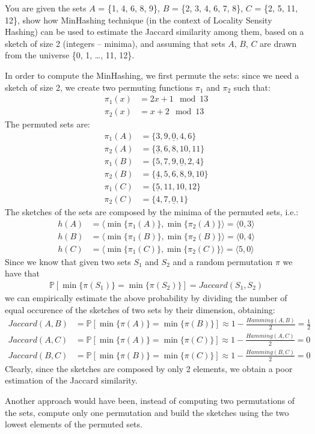\exercise

You are given the sets $A$ = \{1, 4, 6, 8, 9\}, $B$ = \{2, 3, 4, 6, 7, 8\}, $C$ =
\{2, 5, 11, 12\}, show how MinHashing technique (in the context of Locality
Sensity Hashing) can be used to estimate the Jaccard similarity among them,
based on a sketch of size 2 (integers -- minima), and assuming that sets $A$,
$B$, $C$ are drawn from the universe \{0, 1, \dots, 11, 12\}.

\solution In order to compute the MinHashing, we first permute the sets: since
we need a sketch of size 2, we create two permuting functions $\pi_1$ and
$\pi_2$ such that:
%
\begin{align*}
  \pi_1(x) &= 2x + 1 \mod 13 \\
  \pi_2(x) &= x + 2 \mod 13
\end{align*}
%
The permuted sets are:
%
\begin{align*}
  \pi_1(A) &= \{ 3, 9, \underline{0}, 4, 6 \} \\
  \pi_2(A) &= \{ \underline{3}, 6, 8, 10, 11 \} \\
  \pi_1(B) &= \{ 5, 7, 9, \underline{0}, 2, 4 \} \\
  \pi_2(B) &= \{ \underline{4}, 5, 6, 8, 9, 10 \} \\
  \pi_1(C) &= \{ \underline{5}, 11, 10, 12 \} \\
  \pi_2(C) &= \{ 4, 7, \underline{0}, 1 \}
\end{align*}
%
The sketches of the sets are composed by the minima of the permuted sets, i.e.:
%
\begin{align*}
  h(A) &= \langle \min \{ \pi_1(A) \}, \min \{ \pi_2(A) \}\rangle =
  \langle 0, 3 \rangle \\
  h(B) &= \langle \min \{ \pi_1(B) \}, \min \{ \pi_2(B) \}\rangle =
  \langle 0, 4 \rangle \\
  h(C) &= \langle \min \{ \pi_1(C) \}, \min \{ \pi_2(C) \}\rangle =
  \langle 5, 0 \rangle
\end{align*}
%
Since we know that given two sets $S_1$ and $S_2$ and a random permutation $\pi$
we have that
%
\begin{align*}
  \mathbb{P}[ \min \{ \pi(S_1) \} = \min \{ \pi(S_2) \} ] = Jaccard(S_1, S_2)
\end{align*}
%
we can empirically estimate the above probability by dividing the number of
equal occurence of the sketches of two sets by their dimension, obtaining:
%
\begin{align*}
  Jaccard(A, B) &= \mathbb{P}[ \min \{ \pi(A) \} = \min \{ \pi(B) \} ]
  \approx 1 - \frac{Hamming(A, B)}{2} = \frac{1}{2} \\
  Jaccard(A, C) &= \mathbb{P}[ \min \{ \pi(A) \} = \min \{ \pi(C) \} ]
  \approx 1 - \frac{Hamming(A, C)}{2} = 0 \\
  Jaccard(B, C) &= \mathbb{P}[ \min \{ \pi(B) \} = \min \{ \pi(C) \} ]
  \approx 1 - \frac{Hamming(B, C)}{2} = 0
\end{align*}
%
Clearly, since the sketches are composed by only 2 elements, we obtain a poor
estimation of the Jaccard similarity.

Another approach would have been, instead of computing two permutations of the
sets, compute only one permutation and build the sketches using the two lowest
elements of the permuted sets.
